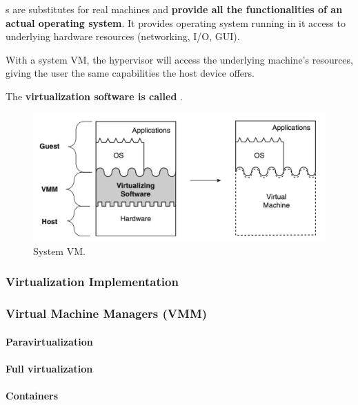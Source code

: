 s are substitutes for real machines and \textbf{provide all the functionalities of an actual operating system}. It provides operating system running in it access to underlying hardware resources (networking, I/O, GUI).

\highspace
With a system VM, the hypervisor will access the underlying machine's resources, giving the user the same capabilities the host device offers.

\highspace
The \textbf{virtualization software is called }.

\begin{figure}[!htp]
    \centering
    \includegraphics[width=.9\textwidth]{img/vm-3.png}
    \caption{System VM.}
\end{figure}

\newpage

\subsubsection{Virtualization Implementation}

\subsubsection{Virtual Machine Managers (VMM)}\label{subsubsection: Virtual Machine Managers (VMM)}

\paragraph{Paravirtualization}

\paragraph{Full virtualization}

\paragraph{Containers}
